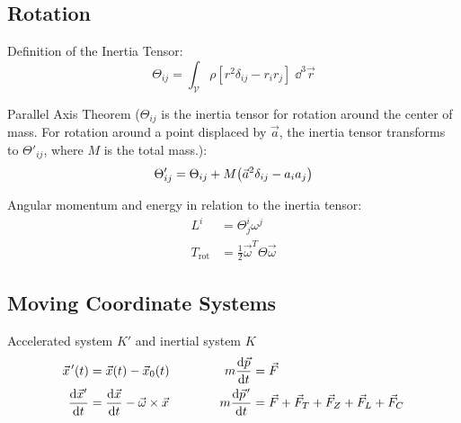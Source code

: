 	\subsection{Rotation}
		\noindent
		Definition of the Inertia Tensor:
		\begin{equation}
			\Theta_{ij}=\int_{\mathcal{V}} \rho \left[r^2\delta_{ij}-r_i r_j\right] \;\dd^3\vec{r}
		\end{equation}

		\noindent
		Parallel Axis Theorem ($\Theta_{ij}$ is the inertia tensor for rotation around the center of mass.
		For rotation around a point displaced by $\vec{a}$, the inertia tensor transforms to $\Theta'_{ij}$, where $M$ is the total mass.):
		\begin{equation}
			\Theta'_{ij} = \Theta_{ij} + M\qty(\vec{a}^2\delta_{ij} - a_i a_j)
		\end{equation}

		\noindent
		Angular momentum and energy in relation to the inertia tensor:
		\begin{equation}
			\begin{aligned}
				L^i &= \Theta^i_j \omega^j \\
				T_{\mathrm{rot}} &= \frac{1}{2}\vec{\omega}^T \Theta \vec{\omega}
			\end{aligned}
		\end{equation}

	\subsection{Moving Coordinate Systems}
		\noindent
		Accelerated system $K'$ and inertial system $K$
		\begin{equation}
			\begin{aligned}
				\pvec{x}'(t) &= \vec{x}(t)-\vec{x}_0(t) &\hspace{30pt}
				m\dv{\vec{p}}{t} &= \vec{F} \\
				\dv{\vec{x}'}{t} &= \dv{\vec{x}}{t}-\vec{\omega}\times\vec{x} &\hspace{30pt}
				m\dv{\pvec{p}'}{t} &= \vec{F} + \vec{F}_T + \vec{F}_Z + \vec{F}_L + \vec{F}_C \\
			\end{aligned}
		\end{equation}

